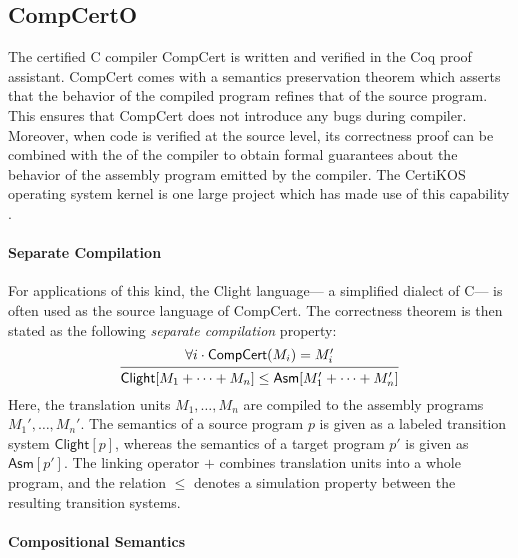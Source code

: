 \documentclass[sigplan,10pt,review,anonymous]{acmart}
\newcommand{\kw}[1]{\ensuremath{ \mathsf{#1} }}
\begin{document}
\subsection{CompCertO} \label{sec:mainideas:compcerto} %

The certified C compiler CompCert \cite{compcert} is
written and verified in the Coq proof assistant.
CompCert comes with a semantics preservation theorem
which asserts that
the behavior of the compiled program
refines that of the source program.
This ensures that CompCert does not introduce any bugs
during compiler.
Moreover,
when code is verified at the source level,
its correctness proof can be combined with the of the compiler
to obtain formal guarantees
about the behavior of the assembly program
emitted by the compiler.
The CertiKOS operating system kernel
is one large project
which has made use of this capability \cite{popl15}.

\paragraph{Separate Compilation} %

For applications of this kind,
the Clight language---%
a simplified dialect of C---%
is often used as the source language of CompCert.
The correctness theorem is then stated as
the following \emph{separate compilation} \cite{sepcompcert} property:
\begin{equation} \label{eqn:scc}
  \begin{prooftree}
    \hypo{\forall i \cdot \kw{CompCert}(M_i) = M_i'}
    \infer1{\kw{Clight}[M_1 + \cdots + M_n]
      \le \kw{Asm}[M_1' + \cdots + M_n']}
  \end{prooftree}
\end{equation}
Here,
the translation units $M_1, \ldots, M_n$
are compiled to the assembly programs $M_1', \ldots, M_n'$.
The semantics of a source program $p$
is given as a labeled transition system $\kw{Clight}[p]$,
whereas the semantics of a target program $p'$
is given as $\kw{Asm}[p']$.
The linking operator $+$
combines translation units into a whole program,
and the relation $\le$ denotes a simulation property
between the resulting transition systems.


\paragraph{Compositional Semantics} %
\end{document}
